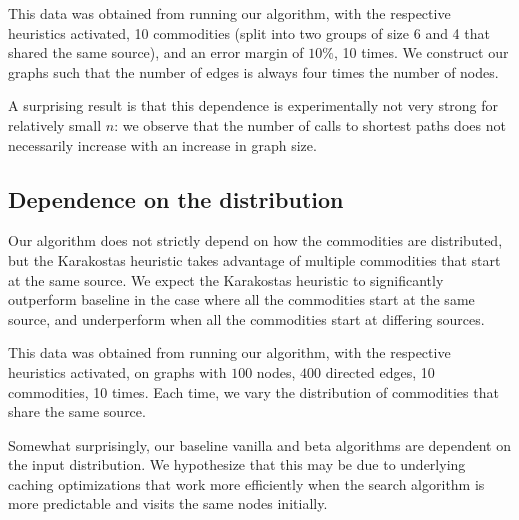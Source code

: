 This data was obtained from running our algorithm, with the respective heuristics activated, 10 commodities (split into
two groups of size 6 and 4 that shared the same source), and an error margin of $10\%$, 10
times. We construct our graphs such that the number of edges is always four times the number of nodes.

A surprising result is that this dependence is experimentally not very strong for relatively small $n$: we observe that
the number of calls to shortest paths does not necessarily increase with an increase in graph size.

\subsection{Dependence on the distribution}

Our algorithm does not strictly depend on how the commodities are distributed, but the Karakostas heuristic takes
advantage of multiple commodities that start at the same source. We expect the Karakostas heuristic to significantly
outperform baseline in the case where all the commodities start at the same source, and underperform when all the
commodities start at differing sources.

This data was obtained from running our algorithm, with the respective heuristics activated, on graphs with $100$
nodes, $400$ directed edges, 10 commodities, 10
times. Each time, we vary the distribution of commodities that share the same source.

Somewhat surprisingly, our baseline vanilla and beta algorithms are dependent on the input distribution.  We hypothesize
that this may be due to underlying caching optimizations that work more efficiently when the search algorithm is more
predictable and visits the same nodes initially.


